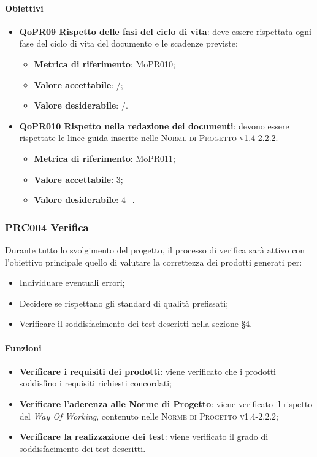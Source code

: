 \documentclass[../piano-di-qualifica.tex]{subfiles}
\begin{document}
\paragraph{Obiettivi}
\label{sub:obiettivi_3}
\begin{itemize}
    \item \textbf{QoPR09 Rispetto delle fasi del ciclo di vita}: deve essere rispettata ogni fase del ciclo di vita del documento e le scadenze previste;
        \begin{itemize}
            \item \textbf{Metrica di riferimento}: MoPR010;
            \item \textbf{Valore accettabile}: /; %
            \item \textbf{Valore desiderabile}: /.
        \end{itemize}
    \item \textbf{QoPR010 Rispetto nella redazione dei documenti}: devono essere rispettate le linee guida inserite nelle \textsc{Norme di Progetto v1.4-2.2.2}.
        \begin{itemize}
            \item \textbf{Metrica di riferimento}: MoPR011;
            \item \textbf{Valore accettabile}: 3; %
            \item \textbf{Valore desiderabile}: 4+.
        \end{itemize}
\end{itemize}

\subsubsection{PRC004 Verifica}
\label{sub:produzione_dei_documenti}
Durante tutto lo svolgimento del progetto, il processo di verifica sarà attivo con l'obiettivo principale quello di valutare la correttezza dei prodotti generati per: 
\begin{itemize}
    \item Individuare eventuali errori;
    \item Decidere se rispettano gli standard di qualità prefissati;
    \item Verificare il soddisfacimento dei test descritti nella sezione §4.
\end{itemize}

\paragraph{Funzioni}
\label{sub:funzioni_4}
\begin{itemize}
    \item \textbf{Verificare i requisiti dei prodotti}: viene verificato che i prodotti soddisfino i requisiti richiesti concordati;
    \item \textbf{Verificare l'aderenza alle Norme di Progetto}: viene verificato il rispetto del \textit{Way Of Working}, contenuto nelle \textsc{Norme di Progetto v1.4-2.2.2};
    \item \textbf{Verificare la realizzazione dei test}: viene verificato il grado di soddisfacimento dei test descritti.
\end{itemize}
\end{document}
